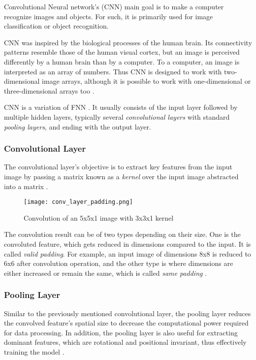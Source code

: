 Convolutional Neural network's (CNN) main goal is to make a computer recognize images and objects. For such, it is primarily used for image classification or object recognition.

CNN was inspired by the biological processes of the human brain. Its connectivity patterns resemble those of the human visual cortex, but an image is perceived differently by a human brain than by a computer. To a computer, an image is interpreted as an array of numbers. Thus CNN is designed to work with two-dimensional image arrays, although it is possible to work with one-dimensional or three-dimensional arrays too \cite{mlmastery}.

CNN is a variation of FNN \cite{Goodfellow-et-al-2016}. It usually consists of the input layer followed by multiple hidden layers, typically several \textit{convolutional layers} with standard \textit{pooling layers}, and ending with the output layer. 

\subsubsection{Convolutional Layer}

The convolutional layer's objective is to extract key features from the input image by passing a matrix known as a \textit{kernel} over the input image abstracted into a matrix \cite{mathworkscnn}.

\begin{figure}[h]
	\centering
    \texttt{[image: conv\_layer\_padding.png]}
	\caption{Convolution of an 5x5x1 image with 3x3x1 kernel \cite{compguideCnn}}
	\label{fig:cnn_conv}
\end{figure}


The convolution result can be of two types depending on their size. One is the convoluted feature, which gets reduced in dimensions compared to the input. It is called \textit{valid padding}. For example, an input image of dimensions 8x8 is reduced to 6x6 after convolution operation, and the other type is where dimensions are either increased or remain the same, which is called \textit{same padding} \cite{compguideCnn}.

\subsubsection{Pooling Layer}


Similar to the previously mentioned convolutional layer, the pooling layer reduces the convolved feature’s spatial size to decrease the computational power required for data processing. In addition, the pooling layer is also useful for extracting dominant features, which are rotational and positional invariant, thus effectively training the model \cite{compguideCnn}.

